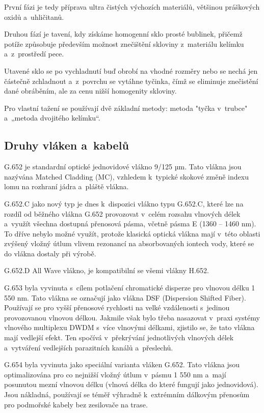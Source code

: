 První fázi je tedy příprava ultra čistých výchozích materiálů, většinou práškových oxidů a~uhličitanů.

Druhou fází je tavení, kdy získáme homogenní sklo prosté bublinek, přičemž potíže způsobuje především možnost znečištění skloviny z~materiálu kelímku a~z~prostředí pece.

Utavené sklo se po vychladnutí buď obrobí na vhodné rozměry nebo se nechá jen částečně zchladnout a~z~povrchu se vytáhne tyčinka, čímž se eliminuje znečistění dané obráběním, ale za cenu nižší homogenity skloviny.

Pro vlastní tažení se používají dvě základní metody: metoda "tyčka v~trubce" a~„metoda dvojitého kelímku“.

\subsection{Druhy vláken a~kabelů}
G.652 je standardní optické jednovidové vlákno 9/125 µm. Tato vlákna jsou nazývána Matched Cladding (MC), vzhledem k~typické skokové změně indexu lomu na rozhraní jádra a~pláště vlákna.

G.652.C jako nový typ je dnes k~dispozici vlákno typu G.652.C, které lze na rozdíl od běžného vlákna G.652 provozovat v~celém rozsahu vlnových délek a~využít všechna dostupná přenosová pásma, včetně pásma E (1360 – 1460 nm). To dříve nebylo
možné využít, protože klasická optická vlákna mají v~této oblasti zvýšený vložný útlum vlivem rezonancí na absorbovaných iontech vody, které se do vlákna dostaly při výrobě.

G.652.D All Wave vlákno, je kompatibilní se všemi vlákny H.652.

G.653 byla vyvinuta s~cílem potlačení chromatické disperze pro vlnovou délku 1 550 nm. Tato vlákna se označují jako vlákna DSF (Dispersion Shifted Fiber). Používají se pro vyšší přenosové rychlosti na velké vzdálenosti s~jedinou provozovanou vlnovou délkou. Jakmile však bylo třeba nasazovat v~praxi systémy vlnového multiplexu DWDM s~více vlnovými délkami, zjistilo se, že tato vlákna mají vedlejší efekt. Ten spočívá v~překrývání jednotlivých vlnových délek a~vytváření vedlejších parazitních kanálů
a~přeslechů.

G.654 byla vyvinuta jako speciální varianta vláken G.652. Tato vlákna jsou optimalizována pro co nejnižší vložný útlum v~pásmu 1 550 nm a~mají posunutou mezní vlnovou délku (vlnová délka do které fungují jako jednovidová). Jsou nákladná, používají se téměř výhradně k~extrémním dálkovým přenosům pro podmořské kabely bez zesilovače na trase.


